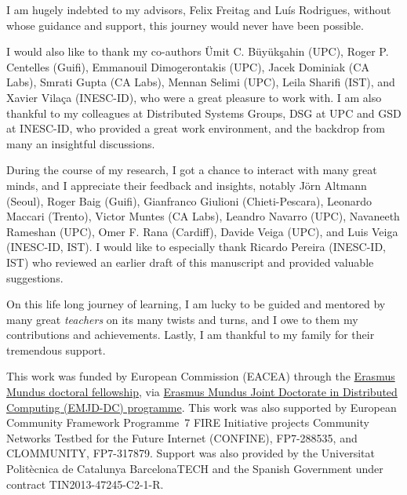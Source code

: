 
I am hugely indebted to my advisors, Felix Freitag and Luís Rodrigues,
without whose guidance and support, this journey would never have been possible.

I would also like to thank my co-authors 
	\"Umit C. B\"uy\"uk\c{s}ahin (UPC),
	Roger P. Centelles (Guifi),
	Emmanouil Dimogerontakis (UPC),
	Jacek Dominiak (CA Labs),
	Smrati Gupta (CA Labs),
	Mennan Selimi (UPC),
	Leila Sharifi (IST), and
	Xavier Vilaça (INESC-ID),
who were a great pleasure to work with.
I am also thankful to my colleagues at Distributed Systems Groups, 
DSG at UPC and GSD at INESC-ID,
who provided a great work environment, 
and the backdrop from many an insightful discussions.

During the course of my research, I got a chance to interact with many great minds, 
and I appreciate their feedback and insights, notably
	Jörn Altmann (Seoul),
	Roger Baig (Guifi),
	Gianfranco Giulioni (Chieti-Pescara),
	Leonardo Maccari (Trento),
	Victor Muntes (CA Labs),
	Leandro Navarro (UPC),
	Navaneeth Rameshan (UPC),
	Omer F. Rana (Cardiff),
	Davide Veiga (UPC), and
	Luis Veiga (INESC-ID, IST).
I would like to especially thank Ricardo Pereira (INESC-ID, IST) 
who reviewed an earlier draft of this manuscript and provided valuable suggestions.

On this life long journey of learning, I am lucky to be guided and mentored by many great \emph{teachers} 
on its many twists and turns, 
and I owe to them my contributions and achievements. 
Lastly, I am thankful to my family for their tremendous support.

\vspace*{\fill}

\parasep

\small{
This work was funded by European Commission (EACEA) through the 
	\href{http://eacea.ec.europa.eu/erasmus_mundus/results_compendia/selected_projects_action_1_joint_doctorates_en.php}
	{Erasmus Mundus doctoral fellowship}, via 
	\href{http://emjd-dc.eu}
	{Erasmus Mundus Joint Doctorate in Distributed Computing (EMJD-DC) programme}.
This work was also supported by European Community Framework Programme~7 FIRE Initiative projects 
	Community Networks Testbed for the Future Internet (CONFINE), FP7-288535, and
	CLOMMUNITY, FP7-317879.
Support was also provided by the Universitat Polit\`ecnica de Catalunya BarcelonaTECH 
and the Spanish Government under contract TIN2013-47245-C2-1-R.
}
